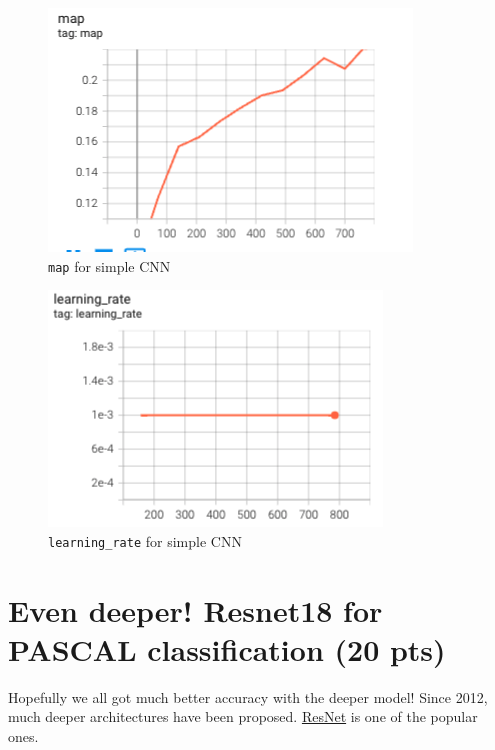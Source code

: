 \documentclass[11pt,addpoints,answers]{exam}
\numberwithin{equation}{section} %
\numberwithin{figure}{section} %
\numberwithin{table}{section} %
\begin{document}
\begin{figure}[H]
    \centering
    \includegraphics{./results/q1/map.png}
    \caption{\texttt{map} for simple CNN}
    \label{fig:q1_map}
\end{figure}

\begin{figure}[H]
    \centering
    \includegraphics{./results/q1/learning_rate.png}
    \caption{\texttt{learning\_rate} for simple CNN}
    \label{fig:q1_loss}
\end{figure}

\clearpage

\section{Even deeper! Resnet18 for PASCAL classification (20 pts)}

Hopefully we all got much better accuracy with the deeper model! Since 2012, much deeper architectures have been proposed. \href{https://arxiv.org/abs/1512.03385}{ResNet} is one of the popular ones.
\end{document}
